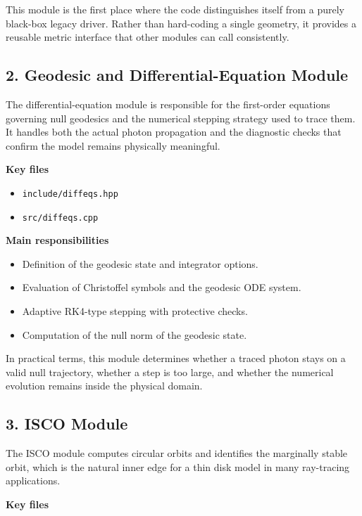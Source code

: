 \documentclass[11pt]{article}
\begin{document}
This module is the first place where the code distinguishes itself from a purely black-box legacy driver. Rather than hard-coding a single geometry, it provides a reusable metric interface that other modules can call consistently.

\subsection{2. Geodesic and Differential-Equation Module}

The differential-equation module is responsible for the first-order equations governing null geodesics and the numerical stepping strategy used to trace them. It handles both the actual photon propagation and the diagnostic checks that confirm the model remains physically meaningful.

\textbf{Key files}

\begin{itemize}[leftmargin=1.5em]
    \item \texttt{include/diffeqs.hpp}
    \item \texttt{src/diffeqs.cpp}
\end{itemize}

\textbf{Main responsibilities}

\begin{itemize}[leftmargin=1.5em]
    \item Definition of the geodesic state and integrator options.
    \item Evaluation of Christoffel symbols and the geodesic ODE system.
    \item Adaptive RK4-type stepping with protective checks.
    \item Computation of the null norm of the geodesic state.
\end{itemize}

In practical terms, this module determines whether a traced photon stays on a valid null trajectory, whether a step is too large, and whether the numerical evolution remains inside the physical domain.

\subsection{3. ISCO Module}

The ISCO module computes circular orbits and identifies the marginally stable orbit, which is the natural inner edge for a thin disk model in many ray-tracing applications.

\textbf{Key files}
\end{document}

